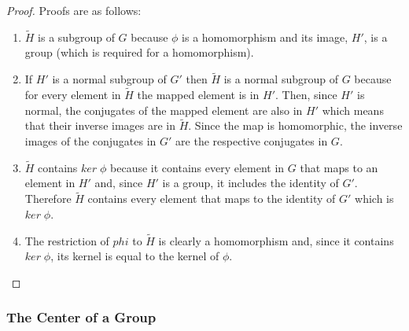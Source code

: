 \documentclass[MathsNotesBase.tex]{subfiles}
\begin{document}
{	\bigskip
	\begin{proof}
		Proofs are as follows:
		\begin{enumerate}[label=(\roman*)]
			\item{$\tilde{H}$ is a subgroup of $G$ because $\phi$ is a homomorphism and its image, $H'$, is a group (which is required for a homomorphism).}
			\item{If $H'$ is a normal subgroup of $G'$ then $\tilde{H}$ is a normal subgroup of $G$ because for every element in $\tilde{H}$ the mapped element is in $H'$. Then, since $H'$ is normal, the conjugates of the mapped element are also in $H'$ which means that their inverse images are in $\tilde{H}$. Since the map is homomorphic, the inverse images of the conjugates in $G'$ are the respective conjugates in $G$.}
			\item{$\tilde{H}$ contains $ker\;\phi$ because it contains every element in $G$ that maps to an element in $H'$ and, since $H'$ is a group, it includes the identity of $G'$. Therefore $\tilde{H}$ contains every element that maps to the identity of $G'$ which is $ker\;\phi$.}
			\item{The restriction of $phi$ to $\tilde{H}$ is clearly a homomorphism and, since it contains $ker\;\phi$, its kernel is equal to the kernel of $\phi$.}
		\end{enumerate}
	\end{proof}
	
	
	\bigskip\bigskip
	\subsubsection{The Center of a Group}
	
}
\end{document}

